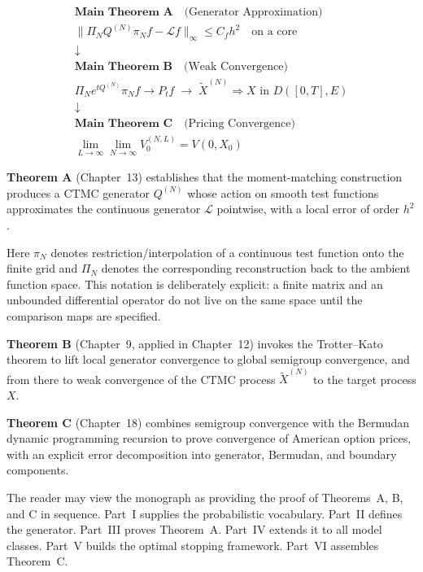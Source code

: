 \documentclass[11pt,a4paper,openany]{book}
\theoremstyle{definition}
\theoremstyle{plain}
\theoremstyle{remark}
\newcommand{\1}{\mathbbm{1}}
\begin{document}
\[
\boxed{\begin{array}{c}
\textbf{Main Theorem A} \quad \text{(Generator Approximation)} \\
\|\Pi_N Q^{(N)} \pi_N f - \mathcal{L} f\|_{\infty} \leq C_{f} h^{2} \quad \text{on a core} \\
\downarrow \\
\textbf{Main Theorem B} \quad \text{(Weak Convergence)} \\
\Pi_N e^{t Q^{(N)}} \pi_N f \to P_{t}f \;\longrightarrow\; \widetilde{X}^{(N)} \Rightarrow X \text{ in } D([0,T],E) \\
\downarrow \\
\textbf{Main Theorem C} \quad \text{(Pricing Convergence)} \\
\displaystyle \lim_{L \to \infty} \lim_{N \to \infty} V_{0}^{(N,L)} = V(0, X_{0})
\end{array}}
\]

\noindent\textbf{Theorem A} (Chapter~13) establishes that the moment-matching construction produces a CTMC generator $Q^{(N)}$ whose action on smooth test functions approximates the continuous generator $\mathcal{L}$ pointwise, with a local error of order $h^{2}$.

\noindent Here $\pi_N$ denotes restriction/interpolation of a continuous test function onto the finite grid and $\Pi_N$ denotes the corresponding reconstruction back to the ambient function space. This notation is deliberately explicit: a finite matrix and an unbounded differential operator do not live on the same space until the comparison maps are specified.

\noindent\textbf{Theorem B} (Chapter~9, applied in Chapter~12) invokes the Trotter--Kato theorem to lift local generator convergence to global semigroup convergence, and from there to weak convergence of the CTMC process $\widetilde{X}^{(N)}$ to the target process $X$.

\noindent\textbf{Theorem C} (Chapter~18) combines semigroup convergence with the Bermudan dynamic programming recursion to prove convergence of American option prices, with an explicit error decomposition into generator, Bermudan, and boundary components.


\noindent The reader may view the monograph as providing the proof of Theorems~A, B, and C in sequence. Part~I supplies the probabilistic vocabulary. Part~II defines the generator. Part~III proves Theorem~A. Part~IV extends it to all model classes. Part~V builds the optimal stopping framework. Part~VI assembles Theorem~C.
\end{document}
